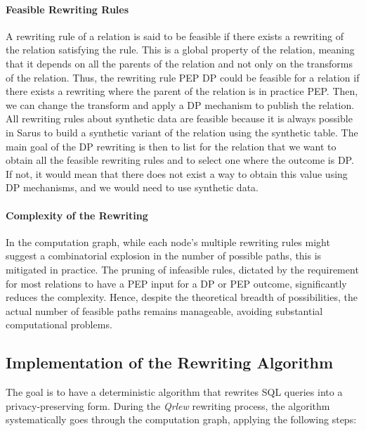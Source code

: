 \documentclass[letterpaper]{article} %
\newcommand{\qrlew}{\emph{Qrlew}}
\begin{document}
\paragraph{Feasible Rewriting Rules}
A rewriting rule of a relation is said to be feasible if there exists a rewriting of the relation satisfying the rule. This is a global property of the relation, meaning that it depends on all the parents of the relation and not only on the transforms of the relation. Thus, the rewriting rule PEP \textrightarrow{} DP could be feasible for a relation if there exists a rewriting where the parent of the relation is in practice PEP. Then, we can change the transform and apply a DP mechanism to publish the relation. All rewriting rules about synthetic data are feasible because it is always possible in Sarus to build a synthetic variant of the relation using the synthetic table. The main goal of the DP rewriting is then to list for the relation that we want to obtain all the feasible rewriting rules and to select one where the outcome is DP. If not, it would mean that there does not exist a way to obtain this value using DP mechanisms, and we would need to use synthetic data.

\paragraph{Complexity of the Rewriting}
In the computation graph, while each node's multiple rewriting rules might suggest a combinatorial explosion in the number of possible paths, this is mitigated in practice. The pruning of infeasible rules, dictated by the requirement for most relations to have a PEP input for a DP or PEP outcome, significantly reduces the complexity. Hence, despite the theoretical breadth of possibilities, the actual number of feasible paths remains manageable, avoiding substantial computational problems.


\subsection{Implementation of the Rewriting Algorithm}

The goal is to have a deterministic algorithm that rewrites SQL queries into a privacy-preserving form. During the \qrlew{} rewriting process, the algorithm systematically goes through the computation graph, applying the following steps:
\end{document}
